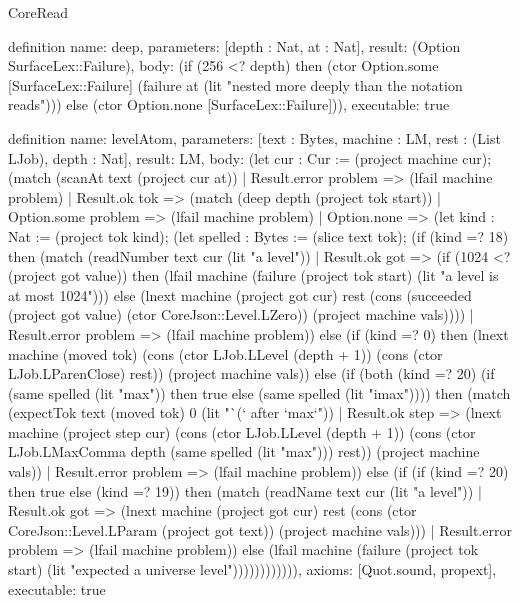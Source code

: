\begin{lexlean}{CoreRead}
\begin{semanticmodule}
definition{
  name: deep,
  parameters: [depth : Nat, at : Nat],
  result: (Option SurfaceLex::Failure),
  body: (if (256 <? depth) then (ctor Option.some [SurfaceLex::Failure] (failure at (lit "nested more deeply than the notation reads"))) else (ctor Option.none [SurfaceLex::Failure])),
  executable: true
}

definition{
  name: levelAtom,
  parameters: [text : Bytes, machine : LM, rest : (List LJob), depth : Nat],
  result: LM,
  body: (let cur : Cur := (project machine cur); (match (scanAt text (project cur at))
    | Result.error problem => (lfail machine problem)
    | Result.ok tok => (match (deep depth (project tok start))
      | Option.some problem => (lfail machine problem)
      | Option.none => (let kind : Nat := (project tok kind); (let spelled : Bytes := (slice text tok); (if (kind =? 18) then (match (readNumber text cur (lit "a level"))
        | Result.ok got => (if (1024 <? (project got value)) then (lfail machine (failure (project tok start) (lit "a level is at most 1024"))) else (lnext machine (project got cur) rest (cons (succeeded (project got value) (ctor CoreJson::Level.LZero)) (project machine vals))))
        | Result.error problem => (lfail machine problem)) else (if (kind =? 0) then (lnext machine (moved tok) (cons (ctor LJob.LLevel (depth + 1)) (cons (ctor LJob.LParenClose) rest)) (project machine vals)) else (if (both (kind =? 20) (if (same spelled (lit "max")) then true else (same spelled (lit "imax")))) then (match (expectTok text (moved tok) 0 (lit "`(` after `max`"))
        | Result.ok step => (lnext machine (project step cur) (cons (ctor LJob.LLevel (depth + 1)) (cons (ctor LJob.LMaxComma depth (same spelled (lit "max"))) rest)) (project machine vals))
        | Result.error problem => (lfail machine problem)) else (if (if (kind =? 20) then true else (kind =? 19)) then (match (readName text cur (lit "a level"))
        | Result.ok got => (lnext machine (project got cur) rest (cons (ctor CoreJson::Level.LParam (project got text)) (project machine vals)))
        | Result.error problem => (lfail machine problem)) else (lfail machine (failure (project tok start) (lit "expected a universe level")))))))))))),
  axioms: [Quot.sound, propext],
  executable: true
}


\end{semanticmodule}
\end{lexlean}
